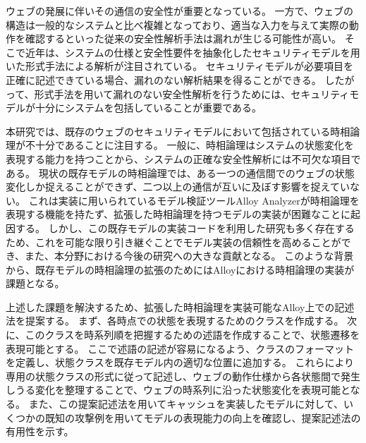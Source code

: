 \documentclass[12pt,a4paper]{jbook}
\begin{document}
ウェブの発展に伴いその通信の安全性が重要となっている。
一方で、ウェブの構造は一般的なシステムと比べ複雑となっており、適当な入力を与えて実際の動作を確認するといった従来の安全性解析手法は漏れが生じる可能性が高い。
そこで近年は、システムの仕様と安全性要件を抽象化したセキュリティモデルを用いた形式手法による解析が注目されている。
セキュリティモデルが必要項目を正確に記述できている場合、漏れのない解析結果を得ることができる。
したがって、形式手法を用いて漏れのない安全性解析を行うためには、セキュリティモデルが十分にシステムを包括していることが重要である。

本研究では、既存のウェブのセキュリティモデルにおいて包括されている時相論理が不十分であることに注目する。
一般に、時相論理はシステムの状態変化を表現する能力を持つことから、システムの正確な安全性解析には不可欠な項目である。
現状の既存モデルの時相論理では、ある一つの通信間でのウェブの状態変化しか捉えることができず、二つ以上の通信が互いに及ぼす影響を捉えていない。
これは実装に用いられているモデル検証ツールAlloy Analyzerが時相論理を表現する機能を持たず、拡張した時相論理を持つモデルの実装が困難なことに起因する。
しかし、この既存モデルの実装コードを利用した研究も多く存在するため、これを可能な限り引き継ぐことでモデル実装の信頼性を高めることができ、また、本分野における今後の研究への大きな貢献となる。
このような背景から、既存モデルの時相論理の拡張のためにはAlloyにおける時相論理の実装が課題となる。

上述した課題を解決するため、拡張した時相論理を実装可能なAlloy上での記述法を提案する。
まず、各時点での状態を表現するためのクラスを作成する。
次に、このクラスを時系列順を把握するための述語を作成することで、状態遷移を表現可能とする。
ここで述語の記述が容易になるよう、クラスのフォーマットを定義し、状態クラスを既存モデル内の適切な位置に追加する。
これらにより専用の状態クラスの形式に従って記述し、ウェブの動作仕様から各状態間で発生しうる変化を整理することで、ウェブの時系列に沿った状態変化を表現可能となる。
また、この提案記述法を用いてキャッシュを実装したモデルに対して、いくつかの既知の攻撃例を用いてモデルの表現能力の向上を確認し、提案記述法の有用性を示す。
\end{document}
